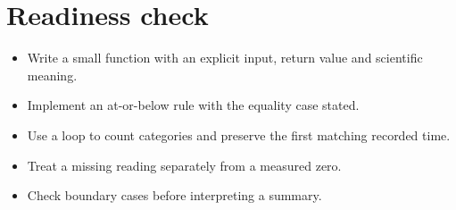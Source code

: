 \documentclass[11pt,letterpaper]{article}
\theoremstyle{definition}\newtheorem{definition}{Definition}\newtheorem{example}{Example}
\numberwithin{equation}{section}
\begin{document}
\section*{Readiness check}
\begin{itemize}
\item Write a small function with an explicit input, return value and scientific meaning.
\item Implement an at-or-below rule with the equality case stated.
\item Use a loop to count categories and preserve the first matching recorded time.
\item Treat a missing reading separately from a measured zero.
\item Check boundary cases before interpreting a summary.
\end{itemize}
\end{document}
